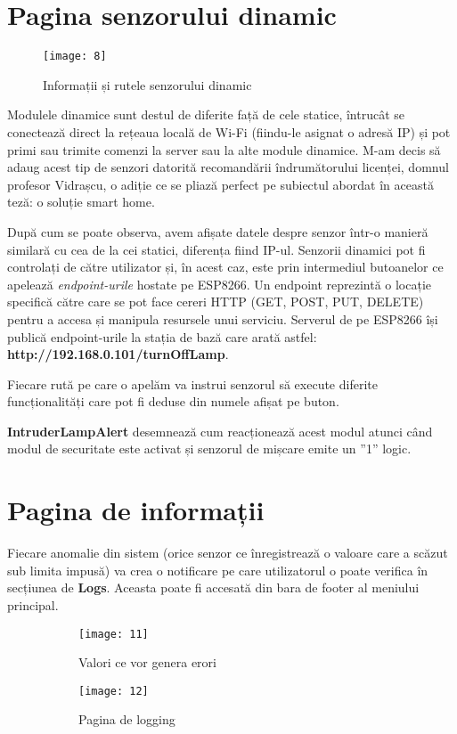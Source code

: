 \section{Pagina senzorului dinamic}

\begin{wrapfigure}{r}{0.3\textwidth}
	\texttt{[image: 8]}
	\caption{Informații și rutele senzorului dinamic}
	\label{fig:8}
\end{wrapfigure}

Modulele dinamice sunt destul de diferite față de cele statice, întrucât se conectează direct la rețeaua locală de Wi-Fi (fiindu-le asignat o adresă IP) și pot primi sau trimite comenzi la server sau la alte module dinamice. M-am decis să adaug acest tip de senzori datorită recomandării îndrumătorului licenței, domnul profesor Vidrașcu, o adiție ce se pliază perfect pe subiectul abordat în această teză: o soluție smart home.

După cum se poate observa, avem afișate datele despre senzor într-o manieră similară cu cea de la cei statici, diferența fiind IP-ul. Senzorii dinamici pot fi controlați de către utilizator și, în acest caz, este prin intermediul butoanelor ce apelează \emph{endpoint-urile} hostate pe ESP8266. Un endpoint reprezintă o locație specifică către care se pot face cereri HTTP (GET, POST, PUT, DELETE) pentru a accesa și manipula resursele unui serviciu. Serverul de pe ESP8266 își publică endpoint-urile la stația de bază care arată astfel: \textbf{http://192.168.0.101/turnOffLamp}.

Fiecare rută pe care o apelăm va instrui senzorul să execute diferite funcționalități care pot fi deduse din numele afișat pe buton.

\textbf{IntruderLampAlert} desemnează cum reacționează acest modul atunci când modul de securitate este activat și senzorul de mișcare emite un ”1” logic.

\section{Pagina de informații}

Fiecare anomalie din sistem (orice senzor ce înregistrează o valoare care a scăzut sub limita impusă) va crea o notificare pe care utilizatorul o poate verifica în secțiunea de \textbf{Logs}. Aceasta poate fi accesată din bara de footer al meniului principal.

\begin{figure}[h]
	\centering
	\begin{subfigure}{0.45\textwidth}
		\texttt{[image: 11]}
		\caption{Valori ce vor genera erori}
		\label{fig:11}
	\end{subfigure}
	\hfill
	\begin{subfigure}{0.35\textwidth}
		\texttt{[image: 12]}
		\caption{Pagina de logging}
		\label{fig:12}
	\end{subfigure}
	\caption{}
	\label{fig:all5}
\end{figure}

